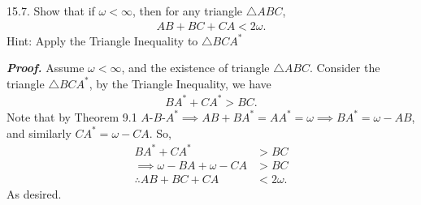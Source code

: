 \documentclass{report}
\begin{document}
    \pagebreak \bigbreak \noindent 
    \begin{mdframed}
        15.7. Show that if $\omega < \infty$, then for any triangle $\triangle ABC$, 
        \begin{align*}
            AB + BC  + CA < 2\omega
        .\end{align*}
        Hint: Apply the Triangle Inequality  to $\triangle BCA^{*} $
    \end{mdframed}
    \bigbreak \noindent 
    \textbf{\textit{Proof.}} Assume $\omega < \infty$, and the existence of triangle $\triangle ABC$.
    \bigbreak \noindent 
    Consider the triangle $\triangle BCA^{*}$, by the Triangle Inequality, we have
    \begin{align*}
       BA^{*} + CA^{*} > BC 
    .\end{align*}
    Note that by Theorem 9.1 $ A\text{-}B\text{-}A^{*} \implies AB + BA^{*} = AA^{*} = \omega \implies BA^{*} = \omega - AB$, and similarly $ CA^{*} = \omega - CA$. So,
    \begin{align*}
        BA^{*} + CA^{*} &> BC \\
        \implies \omega - BA + \omega - CA &> BC \\
        \therefore AB + BC + CA &< 2\omega
    .\end{align*}
    As desired. \endpf
\end{document}
